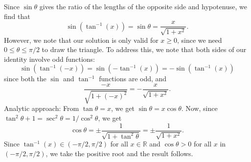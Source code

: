 \documentclass[12pt]{article}
\newcommand{\R}{\mathbb{R}}
\begin{document}
Since $\sin\theta$ gives the ratio of the lengths of the opposite side and hypotenuse, we find that
\[
\sin(\tan^{-1}(x))=\sin\theta = \dfrac{x}{\sqrt{1+x^2}}.
\]
However, we note that our solution is only valid for $x\geq 0$, since we need $0\leq \theta\leq \pi/2$ to draw the triangle. To address this, we note that both sides of our identity involve odd functions:
\[
\sin(\tan^{-1}(-x))=\sin(-\tan^{-1}(x)) = -\sin(\tan^{-1}(x))
\]
since both the $\sin$ and $\tan^{-1}$ functions are odd, and 
\[
\dfrac{-x}{\sqrt{1+(-x)^2}} = -\dfrac{x}{\sqrt{1+x^2}}.
\]
Analytic approach: From $\tan\theta=x$, we get $\sin\theta = x\cos\theta$. Now, since $\tan^2\theta+1=\sec^2\theta=1/\cos^2\theta$, we get
\[
\cos\theta = \pm\frac{1}{\sqrt{1+\tan^2\theta}}=\pm\frac{1}{\sqrt{1+x^2}}.
\]
Since $\tan^{-1}(x)\in (-\pi/2,\pi/2)$ for all $x\in \R$ and $\cos\theta>0$ for all $x$ in $(-\pi/2,\pi/2)$, we take the positive root and the result follows.
\end{document}
